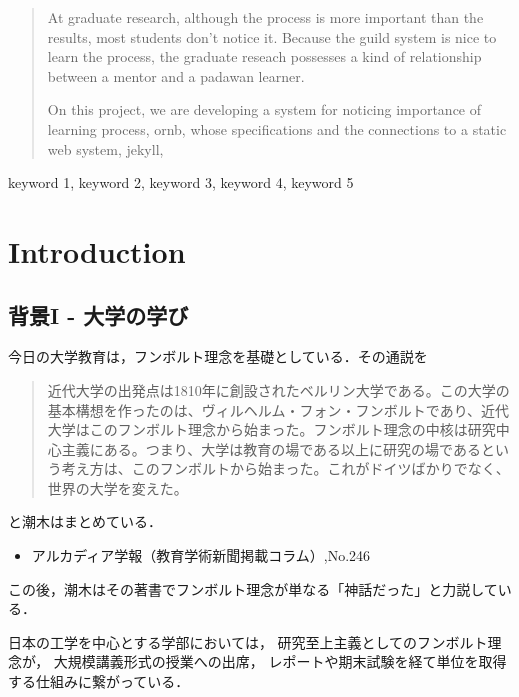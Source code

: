 \documentclass{hissymp}
\author{\texttt{S}}
\date{}
\title{}
\begin{document}
\begin{abstract}
\label{sec:orgcf61c69}
At graduate research, 
although the process is more important than the results,
most students don't notice it.
Because the guild system is nice to learn the process,
the graduate reseach possesses a kind of
relationship between 
a mentor and a padawan learner.

On this project, 
we are developing a system for
noticing importance of learning process,
ornb, whose specifications and 
the connections to a static web system, jekyll,

\end{abstract}

\begin{keyword}
keyword 1, keyword 2, keyword 3, keyword 4, keyword 5
\end{keyword}

\maketitle
\section{Introduction}

\label{sec:org62c9579}
\subsection{背景I - 大学の学び}
\label{sec:orgbf163a9}
今日の大学教育は，フンボルト理念を基礎としている．その通説を
\begin{quote}
近代大学の出発点は1810年に創設されたベルリン大学である。この大学の基本構想を作ったのは、ヴィルヘルム・フォン・フンボルトであり、近代大学はこのフンボルト理念から始まった。フンボルト理念の中核は研究中心主義にある。つまり、大学は教育の場である以上に研究の場であるという考え方は、このフンボルトから始まった。これがドイツばかりでなく、世界の大学を変えた。
\end{quote}
と潮木はまとめている．
\begin{itemize}
\item アルカディア学報（教育学術新聞掲載コラム）,No.246
\end{itemize}
この後，潮木はその著書でフンボルト理念が単なる「神話だった」と力説している．

日本の工学を中心とする学部においては，
研究至上主義としてのフンボルト理念が，
大規模講義形式の授業への出席，
レポートや期末試験を経て単位を取得する仕組みに繋がっている．
\end{document}
